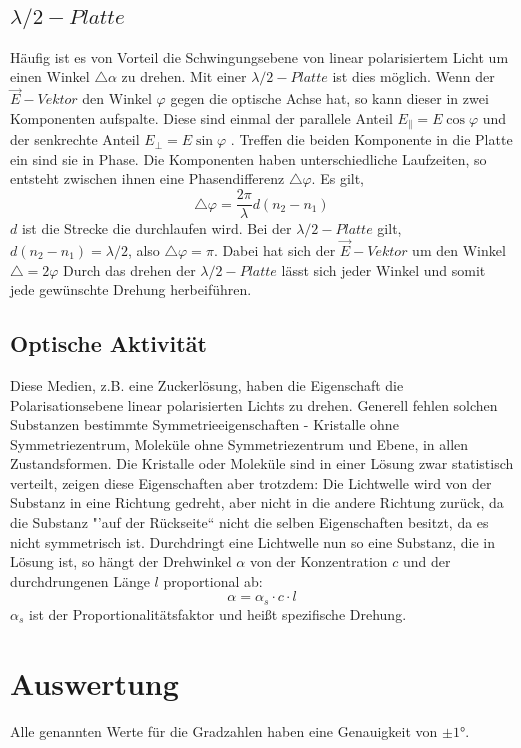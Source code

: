 \subsection{$\lambda/2-Platte$}
Häufig ist es von Vorteil die Schwingungsebene von linear polarisiertem Licht um einen Winkel $ \bigtriangleup\alpha $ zu drehen. Mit einer $ \lambda/2-Platte $ ist dies möglich. Wenn der $ \vec{E}-Vektor $ den Winkel $ \varphi $ gegen die optische Achse hat, so kann dieser in zwei Komponenten aufspalte. Diese sind einmal der parallele Anteil $ E_{\|} = E\cos \varphi $ und der senkrechte Anteil $ E_{\bot}=E\sin \varphi $ . Treffen die beiden Komponente in die Platte ein sind sie in Phase. Die Komponenten haben unterschiedliche Laufzeiten, so entsteht zwischen ihnen eine Phasendifferenz $\bigtriangleup\varphi $. Es gilt, 
\begin{equation}
\bigtriangleup\varphi=\frac{2\pi}{\lambda}d(n_{2}-n_{1})
\end{equation}
$d$ ist die Strecke die durchlaufen wird. Bei der $ \lambda/2 - Platte $ gilt, $ d(n_{2}-n_{1})=\lambda/2 $, also $ \bigtriangleup\varphi=\pi $. Dabei hat sich der $ \vec{E}-Vektor $ um den Winkel $\bigtriangleup=2\varphi $ Durch das drehen der $ \lambda/2-Platte $ lässt sich jeder Winkel und somit jede gewünschte Drehung herbeiführen.
\subsection{Optische Aktivität}
Diese Medien, z.B. eine Zuckerlösung, haben die Eigenschaft die Polarisationsebene linear polarisierten Lichts zu drehen. Generell fehlen solchen Substanzen bestimmte Symmetrieeigenschaften - Kristalle ohne Symmetriezentrum, Moleküle ohne Symmetriezentrum und Ebene, in allen Zustandsformen. Die Kristalle oder Moleküle sind in einer Lösung zwar statistisch verteilt, zeigen diese Eigenschaften aber trotzdem: Die Lichtwelle wird von der Substanz in eine Richtung gedreht, aber nicht in die andere Richtung zurück, da die Substanz "'auf der Rückseite`` nicht die selben Eigenschaften besitzt, da es nicht symmetrisch ist. Durchdringt eine Lichtwelle nun so eine Substanz, die in Lösung ist, so hängt der Drehwinkel $\alpha$ von der Konzentration $c$ und der durchdrungenen Länge $l$ proportional ab:
\begin{equation}
\alpha = \alpha_{s}\cdot c\cdot l
\end{equation}
$\alpha_{s}$ ist der Proportionalitätsfaktor und heißt spezifische Drehung.
\section{Auswertung}
Alle genannten Werte für die Gradzahlen haben eine Genauigkeit von $ \pm 1° $.
